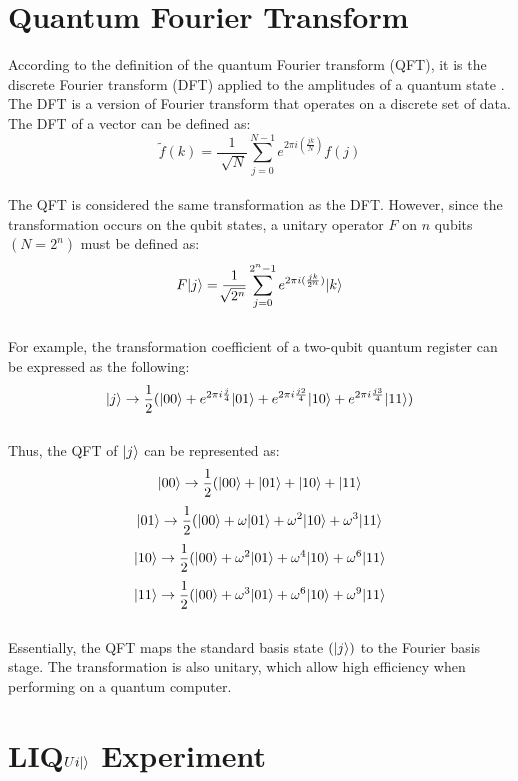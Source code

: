 \documentclass[12pt]{third-rep}
\begin{document}
\chapter{Quantum Fourier Transform}

According to the definition of the quantum Fourier transform (QFT), it is the discrete Fourier transform (DFT) applied to the amplitudes of a quantum state \cite{washington}. The DFT is a version of Fourier transform that operates on a discrete set of data. The DFT of a vector can be defined as:
$$\tilde{f}(k)=\frac{1}{\sqrt[]{N}}\sum_{j=0}^{N-1}e^{2\pi i(\frac{jk}{N})}f(j)$$ \\
The QFT is considered the same transformation as the DFT. However, since the transformation occurs on the qubit states, a unitary operator $F$ on $n$ qubits $(N=2^n)$ must be defined as:
$$F{\left\vert{j}\right\rangle}=\frac{1}{\sqrt[]{2^n}}\sum_{j=0}^{2^n-1}e^{2\pi i(\frac{jk}{2^n})}{\left\vert{k}\right\rangle}$$\\
For example, the transformation coefficient of a two-qubit quantum register can be expressed as the following:
$${\left\vert{j}\right\rangle}\rightarrow\frac{1}{2}({\left\vert{00}\right\rangle}+e^{2\pi i\frac{j}{4}}{\left\vert{01}\right\rangle}+e^{2\pi i\frac{j2}{4}}{\left\vert{10}\right\rangle}+e^{2\pi i\frac{j3}{4}}{\left\vert{11}\right\rangle})$$ \\
Thus, the QFT of ${\left\vert{j}\right\rangle}$ can be represented as:
$${\left\vert{00}\right\rangle}\rightarrow\frac{1}{2}({\left\vert{00}\right\rangle}+{\left\vert{01}\right\rangle}+{\left\vert{10}\right\rangle}+{\left\vert{11}\right\rangle}$$
$${\left\vert{01}\right\rangle}\rightarrow\frac{1}{2}({\left\vert{00}\right\rangle}+\omega{\left\vert{01}\right\rangle}+\omega^2{\left\vert{10}\right\rangle}+\omega^3{\left\vert{11}\right\rangle}$$
$${\left\vert{10}\right\rangle}\rightarrow\frac{1}{2}({\left\vert{00}\right\rangle}+\omega^2{\left\vert{01}\right\rangle}+\omega^4{\left\vert{10}\right\rangle}+\omega^6{\left\vert{11}\right\rangle}$$
$${\left\vert{11}\right\rangle}\rightarrow\frac{1}{2}({\left\vert{00}\right\rangle}+\omega^3{\left\vert{01}\right\rangle}+\omega^6{\left\vert{10}\right\rangle}+\omega^9{\left\vert{11}\right\rangle}$$ \\
Essentially, the QFT maps the standard basis state $({\left\vert{j}\right\rangle})$ to the Fourier basis stage. The transformation is also unitary, which allow high efficiency when performing on a quantum computer.

\chapter{LIQ$Ui{\left\vert{}\right\rangle}$ Experiment}
\end{document}
